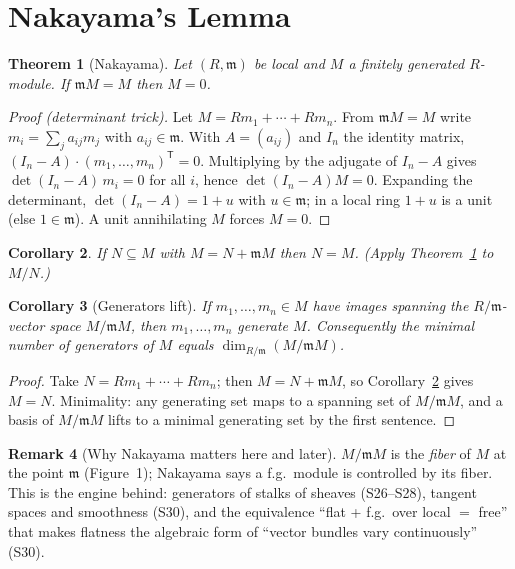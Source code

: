 \documentclass[11pt,a4paper]{article}
\newtheorem{theorem}{Theorem}[section]
\newtheorem{corollary}[theorem]{Corollary}
\theoremstyle{definition}
\newtheorem{remark}[theorem]{Remark}
\newcommand{\m}{\mathfrak{m}}
\begin{document}
\section{Nakayama's Lemma}

\begin{theorem}[Nakayama]\label{thm:nakayama}
Let $(R,\m)$ be local and $M$ a finitely generated $R$-module. If $\m M=M$ then $M=0$.
\end{theorem}
\begin{proof}[Proof (determinant trick)]
Let $M=Rm_1+\cdots+Rm_n$. From $\m M=M$ write $m_i=\sum_j a_{ij}m_j$ with $a_{ij}\in\m$. With
$A=(a_{ij})$ and $I_n$ the identity matrix, $(I_n-A)\cdot(m_1,\dots,m_n)^{\mathsf T}=0$. Multiplying by
the adjugate of $I_n-A$ gives $\det(I_n-A)\,m_i=0$ for all $i$, hence $\det(I_n-A)M=0$. Expanding the
determinant, $\det(I_n-A)=1+u$ with $u\in\m$; in a local ring $1+u$ is a unit (else $1\in\m$).
A unit annihilating $M$ forces $M=0$.
\end{proof}

\begin{corollary}\label{cor:nak-1}
If $N\subseteq M$ with $M=N+\m M$ then $N=M$. (Apply Theorem~\ref{thm:nakayama} to $M/N$.)
\end{corollary}

\begin{corollary}[Generators lift]\label{cor:nak-2}
If $m_1,\dots,m_n\in M$ have images spanning the $R/\m$-vector space $M/\m M$, then $m_1,\dots,m_n$
generate $M$. Consequently the minimal number of generators of $M$ equals $\dim_{R/\m}(M/\m M)$.
\end{corollary}
\begin{proof}
Take $N=Rm_1+\cdots+Rm_n$; then $M=N+\m M$, so Corollary~\ref{cor:nak-1} gives $M=N$. Minimality:
any generating set maps to a spanning set of $M/\m M$, and a basis of $M/\m M$ lifts to a minimal
generating set by the first sentence.
\end{proof}

\begin{remark}[Why Nakayama matters here and later]
$M/\m M$ is the \emph{fiber} of $M$ at the point $\m$ (Figure~1); Nakayama says a f.g.\ module is
controlled by its fiber. This is the engine behind: generators of stalks of sheaves (S26--S28),
tangent spaces and smoothness (S30), and the equivalence ``flat + f.g.\ over local $=$ free''
that makes flatness the algebraic form of ``vector bundles vary continuously'' (S30).
\end{remark}
\end{document}
